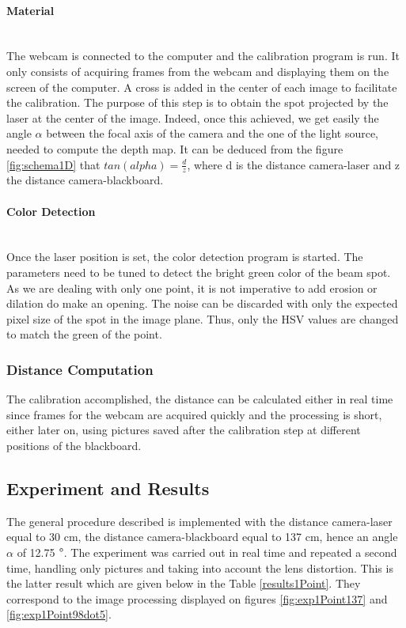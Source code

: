 \paragraph*{Material}
~\\
The webcam is connected to the computer and the calibration program is run. It only consists of acquiring frames from the webcam and displaying them on the screen of the computer. A cross is added in the center of each image to facilitate the calibration. The purpose of this step is to obtain the spot projected by the laser at the center of the image. Indeed, once this achieved, we get easily the angle $\alpha$ between the focal axis of the camera and the one of the light source, needed to compute the depth map. It can be deduced from the figure \ref{fig:schema1D} that $tan(alpha) = \frac{d}{z}$, where d is the distance camera-laser and z the distance camera-blackboard.

\paragraph*{Color Detection}
~\\
Once the laser position is set, the color detection program is started. The parameters need to be tuned to detect the bright green color of the beam spot. As we are dealing with only one point, it is not imperative to add erosion or dilation do make an opening. The noise can be discarded with only the expected pixel size of the spot in the image plane. Thus, only the HSV values are changed to match the green of the point.

\subsubsection{Distance Computation}
The calibration accomplished, the distance can be calculated either in real time since frames for the webcam are acquired quickly and the processing is short, either later on, using pictures saved after the calibration step at different positions of the blackboard.

\subsection{Experiment and Results}
The general procedure described is implemented with the distance camera-laser equal to 30 cm, the distance camera-blackboard equal to 137 cm, hence an angle $\alpha$ of 12.75 $\degree$. The experiment was carried out in real time and repeated a second time, handling only pictures and taking into account the lens distortion. This is the latter result which are given below in the Table \ref{results1Point}. They correspond to the image processing displayed on figures \ref{fig:exp1Point137} and \ref{fig:exp1Point98dot5}.

